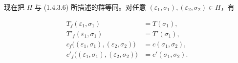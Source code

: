 现在把 $H$ 与 (1.4.3.6) 所描述的群等同。对任意
$(\varepsilon_1,\sigma_1),(\varepsilon_2,\sigma_2)\in H$，有

\begin{equation}
  \begin{aligned}
    T_f(\varepsilon_1,\sigma_1)&=T(\sigma_1),\\
    T'_f(\varepsilon_1,\sigma_1)&=T'(\sigma_1),\\
    c_f\bigl((\varepsilon_1,\sigma_1),(\varepsilon_2,\sigma_2)\bigr)
      &=c(\sigma_1,\sigma_2),\\
    c'_f\bigl((\varepsilon_1,\sigma_1),(\varepsilon_2,\sigma_2)\bigr)
      &=c'(\sigma_1,\sigma_2).
  \end{aligned}
  \tag{1.4.3.7}
\end{equation}
